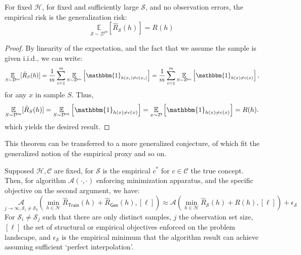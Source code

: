 \documentclass[10pt]{article} %
\begin{document}
\begin{theorem}[\cite{10.5555/2371238}]\label{thm:minimalNeu}
    For fixed $\mathcal{H}$, for fixed and sufficiently large $\mathcal{S}$, and no observation errors, the empirical risk is the generalization risk: \begin{equation}
        \underset{\mathcal{S}\sim \mathcal{D}^{m}}{\mathbb{E}}[\hat{R}_{\mathcal{S}}(h)]  = R(h)
    \end{equation} 
\end{theorem}
\begin{proof}
    By linearity of the expectation, and the fact that we assume the sample is given i.i.d., we can write: 
\[
\underset{S \sim \mathcal{D}^m}{\mathbb{E}}[\hat{R}_S(h)] 
= \frac{1}{m} \sum_{i=1}^m 
\underset{S \sim \mathcal{D}^m}{\mathbb{E}} 
\left[ \mathbbm{1}_{h(x_i) \ne c(x_i)} \right] 
= \frac{1}{m} \sum_{i=1}^m 
\underset{S \sim \mathcal{D}^m}{\mathbb{E}} 
\left[ \mathbbm{1}_{h(x) \ne c(x)} \right],
\]
for any \( x \) in sample \( S \). Thus,
\[
\underset{S \sim \mathcal{D}^m}{\mathbb{E}}[\hat{R}_S(h)] 
= \underset{S \sim \mathcal{D}^m}{\mathbb{E}} 
\left[ \mathbbm{1}_{h(x) \ne c(x)} \right] 
= \underset{x \sim \mathcal{D}}{\mathbb{E}} 
\left[ \mathbbm{1}_{h(x) \ne c(x)} \right] 
= R(h).
\]
which yields the desired result. 
\end{proof}

This theorem can be transferred to a more generalized conjecture, of which fit the generalized notion of the empirical proxy and so on. 
\begin{conjecture}
    Supposed $\mathcal{H},\mathcal{C}$ are fixed, for $\mathcal{S}$ is the empirical $c^{*}$ for $c\in \mathcal{C}$ the true concept. Then, for algorithm $\mathcal{A}(\cdot,\cdot)$ enforcing minimization apparatus, and the specific objective on the second argument, we have:
    \begin{equation}
        \underset{j\to\infty,\mathcal{S}_{i}\neq\mathcal{S}_{k}}{\mathcal{A}}\left(\min_{h\in\mathcal{H}} \hat{R}_{\mathsf{Train}}(h) + \hat{R}_{\mathsf{Gen}}(h), [\ell]\right) \approx \mathcal{A}\left(\min_{h\in\mathcal{H}} \hat{R}_{\mathcal{S}}(h) + R(h), [\ell]\right) + \epsilon_{\mathcal{S}}
    \end{equation}
    For $\mathcal{S}_{i}\neq\mathcal{S}_{j}$ such that there are only distinct samples, $j$ the observation set size, $[\ell]$ the set of structural or empirical objectives enforced on the problem landscape, and $\epsilon_{\mathcal{S}}$ is the empirical minimum that the algorithm result can achieve assuming sufficient `perfect interpolation'. 
\end{conjecture}
\end{document}
